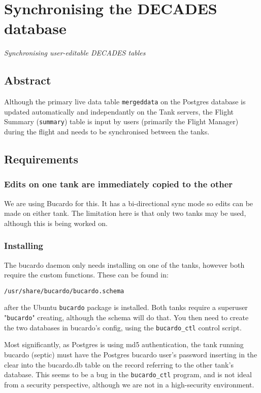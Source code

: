 

\chapter{Synchronising the DECADES database}
\begin{center}
{\small\em Synchronising user-editable DECADES tables}
\end{center}

\section{Abstract}
Although the primary live data table {\tt mergeddata} on the Postgres database is updated automatically and independantly on the Tank servers, the Flight Summary ({\tt summary}) table is input
by users (primarily the Flight Manager) during the flight and needs to be synchronised between
the tanks.

\section{Requirements}
\subsection{Edits on one tank are immediately copied to the other} 
We are using Bucardo \cite{bucardo} for this. It has a bi-directional sync mode so edits can be made on either
tank. The limitation here is that only two tanks may be used, although this is being worked
on.

\subsection{Installing}
The bucardo daemon only needs installing on one of the tanks, 
however both require the custom functions. These can be found in:

{\tt /usr/share/bucardo/bucardo.schema }

after the Ubuntu {\tt bucardo} package is installed. Both tanks require a superuser "{\tt bucardo}" 
creating, although the schema will do that. You then need to create the two databases
 in bucardo's config, using the {\tt bucardo\_ctl} control script\cite{bucardoinstall}.

Most significantly, as Postgres is using md5 authentication, the tank running bucardo (septic) 
must have the Postgres bucardo user's password inserting in the clear into the bucardo.db 
table on the record referring to the other tank's database. 
This seems to be a bug in the {\tt bucardo_ctl} program, and is not ideal from a security 
perspective, although we are not in a high-security environment.
\newpage
